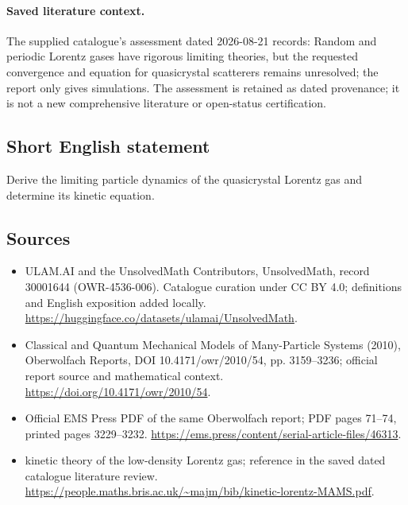 \documentclass[11pt]{article}
\begin{document}
\paragraph{Saved literature context.} The supplied catalogue's assessment dated 2026-08-21 records: Random and periodic Lorentz gases have rigorous limiting theories, but the requested convergence and equation for quasicrystal scatterers remains unresolved; the report only gives simulations. The assessment is retained as dated provenance; it is not a new comprehensive literature or open-status certification.
\subsection{Short English statement}
Derive the limiting particle dynamics of the quasicrystal Lorentz gas and determine its kinetic equation.
\subsection{Sources}
\begin{itemize}
\item[\hypertarget{source:30001644:1}{S1}] ULAM.AI and the UnsolvedMath Contributors, UnsolvedMath, record 30001644 (OWR-4536-006). Catalogue curation under CC BY 4.0; definitions and English exposition added locally.
\url{https://huggingface.co/datasets/ulamai/UnsolvedMath}.
\item[\hypertarget{source:30001644:2}{S2}] Classical and Quantum Mechanical Models of Many-Particle Systems (2010), Oberwolfach Reports, DOI 10.4171/owr/2010/54, pp. 3159--3236; official report source and mathematical context.
\url{https://doi.org/10.4171/owr/2010/54}.
\item[\hypertarget{source:30001644:3}{S3}] Official EMS Press PDF of the same Oberwolfach report; PDF pages 71--74, printed pages 3229--3232.
\url{https://ems.press/content/serial-article-files/46313}.
\item[\hypertarget{source:30001644:4}{S4}] kinetic theory of the low-density Lorentz gas; reference in the saved dated catalogue literature review.
\url{https://people.maths.bris.ac.uk/~majm/bib/kinetic-lorentz-MAMS.pdf}.
\end{itemize}
\label{end:30001644}
\end{document}
